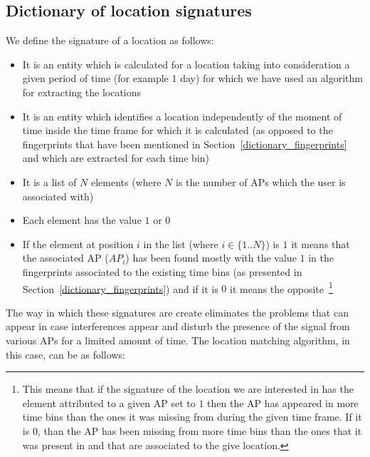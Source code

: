 \subsection{Dictionary of location signatures}
\label{dictionary_signatures}
We define the signature of a location as follows:
\begin{itemize}
  \item It is an entity which is calculated for a location taking into
  consideration a given period of time (for example $1$ day) for which we have
  used an algorithm for extracting the locations
  \item It is an entity which identifies a location independently of the moment
  of time inside the time frame for which it is calculated (as opposed to the
  fingerprints that have been mentioned in 
  Section~\ref{dictionary_fingerprints} and which are extracted for each time bin)
  \item It is a list of $N$ elements (where $N$ is the number of APs which the
  user is associated with)
  \item Each element has the value $1$ or $0$
  \item If the element at position $i$ in the list (where $i \in \{1..N\}$) is
  $1$ it means that the associated AP ($AP_{i}$) has been found mostly with the
  value $1$ in the fingerprints associated to the existing time bins (as
  presented in Section~\ref{dictionary_fingerprints}) and if it is $0$
  it means the opposite~\footnote{This means that if the signature of the
  location we are interested in has the element attributed to a given AP set to
  $1$ then the AP has appeared in more time bins than the ones it was missing
  from during the given time frame. If it is $0$, than the AP has been missing
  from more time bins than the ones that it was present in and that are
  associated to the give location.}
\end{itemize}

The way in which these signatures are create eliminates the problems that can
appear in case interferences appear and disturb the presence of the signal from
various APs for a limited amount of time. The location matching algorithm, in
this case, can be as follows:

